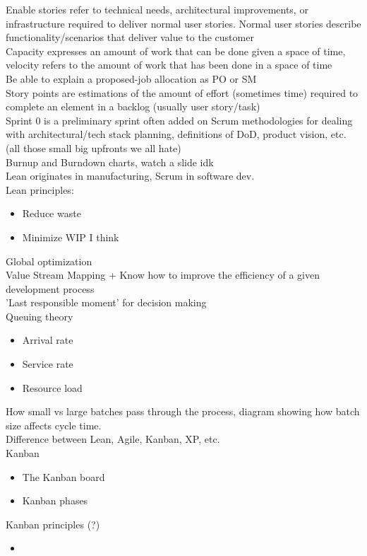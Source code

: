 \documentclass[10pt]{article}
\begin{document}
Enable stories refer to technical needs, architectural improvements, or infrastructure required to deliver normal user stories. Normal user stories describe functionality/scenarios that deliver value to the customer\\
Capacity expresses an amount of work that can be done given a space of time, velocity refers to the amount of work that has been done in a space of time\\
Be able to explain a proposed-job allocation as PO or SM\\
Story points are estimations of the amount of effort (sometimes time) required to complete an element in a backlog (usually user story/task)\\
Sprint 0 is a preliminary sprint often added on Scrum methodologies for dealing with architectural/tech stack planning, definitions of DoD, product vision, etc. (all those small big upfronts we all hate)\\
Burnup and Burndown charts, watch a slide idk\\
Lean originates in manufacturing, Scrum in software dev.\\
Lean principles:
\begin{itemize}
\item Reduce waste
\item Minimize WIP I think
\end{itemize}
Global optimization\\
Value Stream Mapping + Know how to improve the efficiency of a given development process\\
'Last responsible moment' for decision making\\
Queuing theory
\begin{itemize}
\item Arrival rate
\item Service rate
\item Resource load
\end{itemize}
How small vs large batches pass through the process, diagram showing how batch size affects cycle time.\\
Difference between Lean, Agile, Kanban, XP, etc.\\
Kanban
\begin{itemize}
\item The Kanban board
\item Kanban phases
\end{itemize}
Kanban principles (?)
\begin{itemize}
\item 
\end{itemize}
\end{document}
